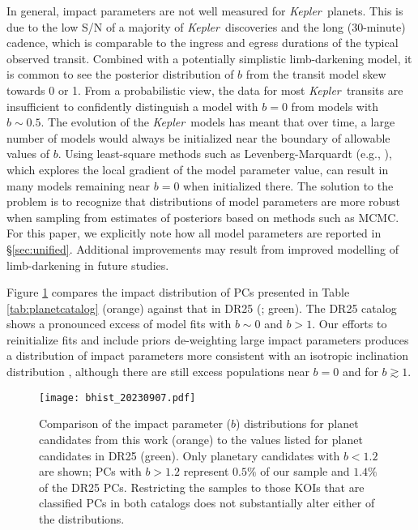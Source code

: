 \documentclass{aastex62}
\newcommand{\ik}{{\it Kepler~}}
\begin{document}
In general, impact parameters are not well measured for \ik planets.  This is due to the low S/N of a majority of \ik discoveries and the long (30-minute) cadence, which is comparable to the ingress and egress durations of the typical observed transit.  Combined with a potentially simplistic limb-darkening model, it is common to see the posterior distribution of $b$ from the transit model skew towards 0 or 1.  From a probabilistic view, the data for most \ik transits are insufficient to confidently distinguish a model with $b=0$ from models with $b \sim 0.5$.  The evolution of the \ik models has meant that over time, a large number of models would always be initialized near the boundary of allowable values of $b$.  Using least-square methods such as Levenberg-Marquardt (e.g., \citealt{More:1980}), which explores the local gradient of the model parameter value, can result in many models remaining near $b=0$ when initialized there.  The solution to the problem is to recognize that distributions of model parameters are more robust when sampling from estimates of posteriors based on methods such as MCMC.   For this paper, we explicitly note how all model parameters are reported in \S\ref{sec:unified}. Additional improvements may result from improved modelling of limb-darkening in future studies.

Figure \ref{fig:b_hist} compares the impact distribution of PCs presented in Table \ref{tab:planetcatalog} (orange) against that in DR25 (\citealt{Thompson:2018}; green). The DR25 catalog shows a pronounced excess of model fits with $b\sim0$ and $b>1$. Our efforts to reinitialize fits and include priors de-weighting large impact parameters produces a distribution of impact parameters more consistent with an isotropic inclination distribution \citep{Kipping:2016}, although there are still excess populations near $b = 0$ and for $b \gtrsim 1$.  

\begin{figure}[!hbt]
\texttt{[image: bhist\_20230907.pdf]}
\caption{{Comparison of the impact parameter ($b$) distributions for planet candidates from this work (orange) to the values listed for planet candidates in DR25 (green).  Only planetary candidates with $b<1.2$ are shown; PCs with $b>1.2$ represent $0.5\%$ of our sample and $1.4\%$ of the DR25 PCs. Restricting the samples to those KOIs that are classified PCs in both catalogs does not substantially alter either of the distributions. %
}
}\label{fig:b_hist}
\end{figure}
\end{document}
